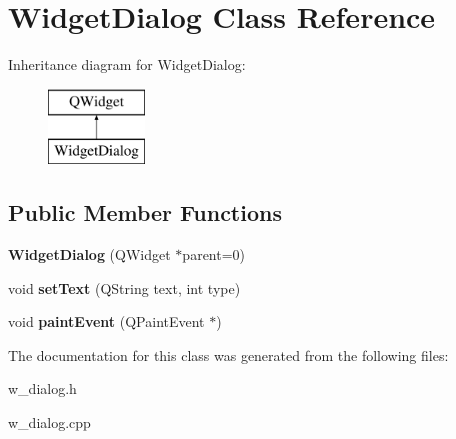 \hypertarget{class_widget_dialog}{}\section{Widget\+Dialog Class Reference}
\label{class_widget_dialog}
Inheritance diagram for Widget\+Dialog\+:\begin{figure}[H]
\begin{center}
\leavevmode
\includegraphics[height=2.000000cm]{class_widget_dialog}
\end{center}
\end{figure}
\subsection*{Public Member Functions}
\begin{DoxyCompactItemize}
\item 
\hypertarget{class_widget_dialog_aa282c5193c1318f92bd21fe77a3f66bb}{}{\bfseries Widget\+Dialog} (Q\+Widget $\ast$parent=0)\label{class_widget_dialog_aa282c5193c1318f92bd21fe77a3f66bb}

\item 
\hypertarget{class_widget_dialog_ad4ee3d228612e11780f73839db9150a9}{}void {\bfseries set\+Text} (Q\+String text, int type)\label{class_widget_dialog_ad4ee3d228612e11780f73839db9150a9}

\item 
\hypertarget{class_widget_dialog_aa3af6ec9a3e6dc42e82f86a851994614}{}void {\bfseries paint\+Event} (Q\+Paint\+Event $\ast$)\label{class_widget_dialog_aa3af6ec9a3e6dc42e82f86a851994614}

\end{DoxyCompactItemize}


The documentation for this class was generated from the following files\+:\begin{DoxyCompactItemize}
\item 
w\+\_\+dialog.\+h\item 
w\+\_\+dialog.\+cpp\end{DoxyCompactItemize}
